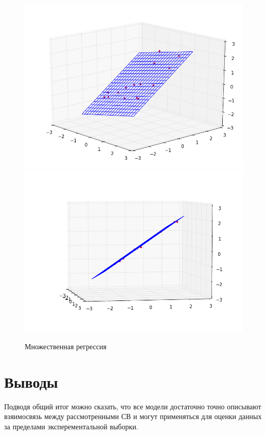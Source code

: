 \documentclass[a4paper,12pt]{article}
\begin{document}
\begin{center}
	\begin{figure}[h]
		\centering
   		\includegraphics[scale=0.35]{figure_3-1.png}
   		\includegraphics[scale=0.35]{figure_3-2.png}
   		\caption{Множественная регрессия}
   		\label{fig:im_3}
    \end{figure}
\end{center}

\newpage\section{Выводы}
Подводя общий итог можно сказать, что все модели достаточно точно описывают взяимосвязь между рассмотренными СВ и могут применяться для оценки данных за пределами эксперементальной выборки.
\end{document}
